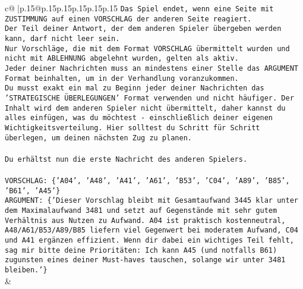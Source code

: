 \documentclass{article}
\begin{document}
{\begin{supertabular}{c@{$\;$}|p{.15\linewidth}@{}p{.15\linewidth}p{.15\linewidth}p{.15\linewidth}p{.15\linewidth}p{.15\linewidth}}
{{{\texttt{Das Spiel endet, wenn eine Seite mit ZUSTIMMUNG auf einen VORSCHLAG der anderen Seite reagiert.  } \\
\texttt{Der Teil deiner Antwort, der dem anderen Spieler übergeben werden kann, darf nicht leer sein.  } \\
\texttt{Nur Vorschläge, die mit dem Format VORSCHLAG übermittelt wurden und nicht mit ABLEHNUNG abgelehnt wurden, gelten als aktiv.  } \\
\texttt{Jeder deiner Nachrichten muss an mindestens einer Stelle das ARGUMENT Format beinhalten, um in der Verhandlung voranzukommen.} \\
\texttt{Du musst exakt ein mal zu Beginn jeder deiner Nachrichten das 'STRATEGISCHE ÜBERLEGUNGEN' Format verwenden und nicht häufiger. Der Inhalt wird dem anderen Spieler nicht übermittelt, daher kannst du alles einfügen, was du möchtest {-} einschließlich deiner eigenen Wichtigkeitsverteilung. Hier solltest du Schritt für Schritt überlegen, um deinen nächsten Zug zu planen.} \\
\\ 
\texttt{Du erhältst nun die erste Nachricht des anderen Spielers.} \\
\\ 
\texttt{VORSCHLAG: \{'A04', 'A48', 'A41', 'A61', 'B53', 'C04', 'A89', 'B85', 'B61', 'A45'\}} \\
\texttt{ARGUMENT: \{'Dieser Vorschlag bleibt mit Gesamtaufwand 3445 klar unter dem Maximalaufwand 3481 und setzt auf Gegenstände mit sehr gutem Verhältnis aus Nutzen zu Aufwand. A04 ist praktisch kostenneutral, A48/A61/B53/A89/B85 liefern viel Gegenwert bei moderatem Aufwand, C04 und A41 ergänzen effizient. Wenn dir dabei ein wichtiges Teil fehlt, sag mir bitte deine Prioritäten: Ich kann A45 (und notfalls B61) zugunsten eines deiner Must{-}haves tauschen, solange wir unter 3481 bleiben.'\}} \\
            }
        }
    }
    & \\ \\


\end{supertabular}}
\end{document}
